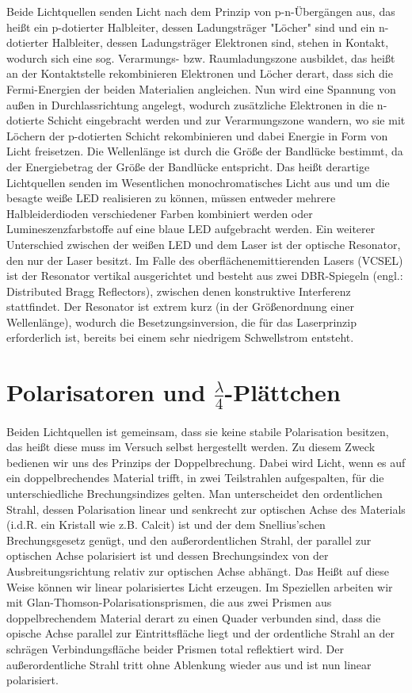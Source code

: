 \documentclass[bigchapter,colorback,accentcolor=tud4b,linedtoc,11pt]{tudreport}
\begin{document}
Beide Lichtquellen senden Licht nach dem Prinzip von p-n-Übergängen aus, das heißt ein p-dotierter Halbleiter, dessen Ladungsträger "Löcher" sind und ein n-dotierter Halbleiter, dessen Ladungsträger Elektronen sind, stehen in Kontakt, wodurch sich eine sog. Verarmungs- bzw. Raumladungszone ausbildet, das heißt an der Kontaktstelle rekombinieren Elektronen und Löcher derart, dass sich die Fermi-Energien der beiden Materialien angleichen. Nun wird eine Spannung von außen in Durchlassrichtung angelegt, wodurch zusätzliche Elektronen in die n-dotierte Schicht eingebracht werden und zur Verarmungszone wandern, wo sie mit Löchern der p-dotierten Schicht rekombinieren und dabei Energie in Form von Licht freisetzen. Die Wellenlänge ist durch die Größe der Bandlücke bestimmt, da der Energiebetrag der Größe der Bandlücke entspricht. Das heißt derartige Lichtquellen senden im Wesentlichen monochromatisches Licht aus und um die besagte weiße LED realisieren zu können, müssen entweder mehrere Halbleiderdioden verschiedener Farben kombiniert werden oder Lumineszenzfarbstoffe auf eine blaue LED aufgebracht werden. Ein weiterer Unterschied zwischen der weißen LED und dem Laser ist der optische Resonator, den nur der Laser besitzt. Im Falle des oberflächenemittierenden Lasers (VCSEL) ist der Resonator vertikal ausgerichtet und besteht aus zwei DBR-Spiegeln (engl.: Distributed Bragg Reflectors), zwischen denen konstruktive Interferenz stattfindet. Der Resonator ist extrem kurz (in der Größenordnung einer Wellenlänge), wodurch die Besetzungsinversion, die für das Laserprinzip erforderlich ist, bereits bei einem sehr niedrigem Schwellstrom entsteht.

\section{Polarisatoren und $\frac{\lambda}{4}$-Plättchen}
Beiden Lichtquellen ist gemeinsam, dass sie keine stabile Polarisation besitzen, das heißt diese muss im Versuch selbst hergestellt werden. Zu diesem Zweck bedienen wir uns des Prinzips der Doppelbrechung. Dabei wird Licht, wenn es auf ein doppelbrechendes Material trifft, in zwei Teilstrahlen aufgespalten, für die unterschiedliche Brechungsindizes gelten. Man unterscheidet den ordentlichen Strahl, dessen Polarisation linear und senkrecht zur optischen Achse des Materials (i.d.R. ein Kristall wie z.B. Calcit) ist und der dem Snellius'schen Brechungsgesetz genügt, und den außerordentlichen Strahl, der parallel zur optischen Achse polarisiert ist und dessen Brechungsindex von der Ausbreitungsrichtung relativ zur optischen Achse abhängt. Das Heißt auf diese Weise können wir linear polarisiertes Licht erzeugen. Im Speziellen arbeiten wir mit Glan-Thomson-Polarisationsprismen, die aus zwei Prismen aus doppelbrechendem Material derart zu einen Quader verbunden sind, dass die opische Achse parallel zur Eintrittsfläche liegt und der ordentliche Strahl an der schrägen Verbindungsfläche beider Prismen total reflektiert wird. Der außerordentliche Strahl tritt ohne Ablenkung wieder aus und ist nun linear polarisiert.
\end{document}

